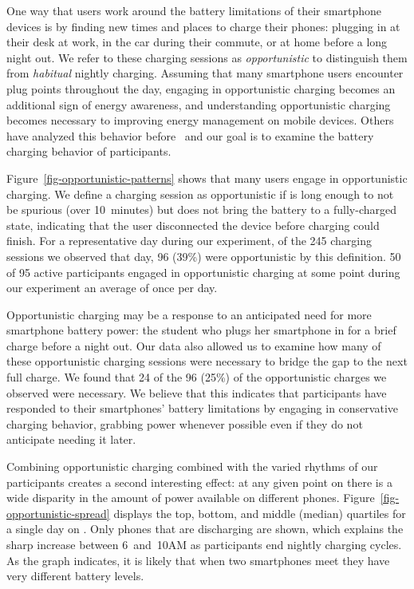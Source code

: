 One way that users work around the battery limitations of their smartphone
devices is by finding new times and places to charge their phones: plugging
in at their desk at work, in the car during their commute, or at home before
a long night out. We refer to these charging sessions as
\textit{opportunistic} to distinguish them from \textit{habitual} nightly
charging. Assuming that many smartphone users encounter plug points
throughout the day, engaging in opportunistic charging becomes an additional
sign of energy awareness, and understanding opportunistic charging becomes
necessary to improving energy management on mobile devices. Others have analyzed
this behavior before~\cite{banerjee:ubicomp:2007, rahmati:mobilehci:2007} and
our goal is to examine the battery charging behavior of \PhoneLab{} participants.

Figure~\ref{fig-opportunistic-patterns} shows that many users engage in
opportunistic charging. We define a charging session as opportunistic if is
long enough to not be spurious (over 10~minutes) but does not bring the
battery to a fully-charged state, indicating that the user disconnected the
device before charging could finish. For a representative day during our
experiment, of the 245 charging sessions we observed that day, 96 (39\%) were
opportunistic by this definition. 50 of 95 active participants engaged in
opportunistic charging at some point during our experiment an average of once
per day.

Opportunistic charging may be a response to an anticipated need for more
smartphone battery power: the student who plugs her smartphone in for a brief
charge before a night out. Our data also allowed us to examine how many of
these opportunistic charging sessions were necessary to bridge the gap to the
next full charge. We found that 24 of the 96 (25\%) of the opportunistic
charges we observed were necessary. We believe that this indicates that
participants have responded to their smartphones' battery limitations by
engaging in conservative charging behavior, grabbing power whenever possible
even if they do not anticipate needing it later.

Combining opportunistic charging combined with the varied rhythms of our
participants creates a second interesting effect: at any given point on
\PhoneLab{} there is a wide disparity in the amount of power available on
different phones. Figure~\ref{fig-opportunistic-spread} displays the top,
bottom, and middle (median) quartiles for a single day on \PhoneLab{}. Only
phones that are discharging are shown, which explains the sharp increase
between 6~and~10AM as participants end nightly charging cycles.  As the graph
indicates, it is likely that when two smartphones meet they have very
different battery levels.

